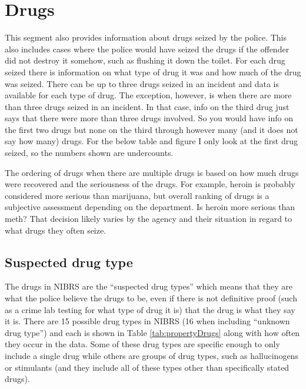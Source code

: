 \documentclass[
]{krantz}
\begin{document}
\section{Drugs}\label{drugs}

This segment also provides information about drugs seized by
the police. This also includes cases where the police would
have seized the drugs if the offender did not destroy it
somehow, such as flushing it down the toilet. For each drug
seized there is information on what type of drug it was and
how much of the drug was seized. There can be up to three
drugs seized in an incident and data is available for each
type of drug. The exception, however, is when there are more
than three drugs seized in an incident. In that case, info
on the third drug just says that there were more than three
drugs involved. So you would have info on the first two
drugs but none on the third through however many (and it
does not say how many) drugs. For the below table and figure
I only look at the first drug seized, so the numbers shown
are undercounts.

The ordering of drugs when there are multiple drugs is based
on how much drugs were recovered and the seriousness of the
drugs. For example, heroin is probably considered more
serious than marijuana, but overall ranking of drugs is a
subjective assessment depending on the department. Is heroin
more serious than meth? That decision likely varies by the
agency and their situation in regard to what drugs they
often seize.

\subsection{Suspected drug type}\label{suspected-drug-type}

The drugs in NIBRS are the ``suspected drug types'' which
means that they are what the police believe the drugs to be,
even if there is not definitive proof (such as a crime lab
testing for what type of drug it is) that the drug is what
they say it is. There are 15 possible drug types in NIBRS
(16 when including ``unknown drug type'') and each is shown
in Table \ref{tab:propertyDrugs} along with how often they
occur in the data. Some of these drug types are specific
enough to only include a single drug while others are groups
of drug types, such as hallucinogens or stimulants (and they
include all of these types other than specifically stated
drugs).
\end{document}
